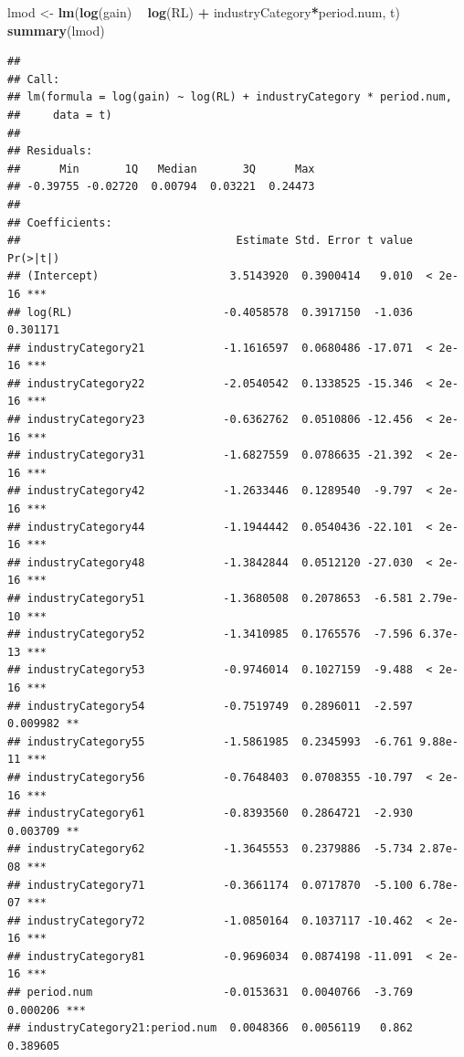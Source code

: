 \documentclass[
]{article}
\newenvironment{Shaded}{\begin{snugshade}}{\end{snugshade}}
\newcommand{\KeywordTok}[1]{\textcolor[rgb]{0.13,0.29,0.53}{\textbf{#1}}}
\newcommand{\NormalTok}[1]{#1}
\newcommand{\OperatorTok}[1]{\textcolor[rgb]{0.81,0.36,0.00}{\textbf{#1}}}
\newcommand{\StringTok}[1]{\textcolor[rgb]{0.31,0.60,0.02}{#1}}
\begin{document}
\begin{Shaded}
\begin{Highlighting}[]
\NormalTok{lmod <-}\StringTok{ }\KeywordTok{lm}\NormalTok{(}\KeywordTok{log}\NormalTok{(gain) }\OperatorTok{~}\StringTok{ }\KeywordTok{log}\NormalTok{(RL) }\OperatorTok{+}\StringTok{ }\NormalTok{industryCategory}\OperatorTok{*}\NormalTok{period.num, t)}
\KeywordTok{summary}\NormalTok{(lmod)}
\end{Highlighting}
\end{Shaded}

\begin{verbatim}
## 
## Call:
## lm(formula = log(gain) ~ log(RL) + industryCategory * period.num, 
##     data = t)
## 
## Residuals:
##      Min       1Q   Median       3Q      Max 
## -0.39755 -0.02720  0.00794  0.03221  0.24473 
## 
## Coefficients:
##                                 Estimate Std. Error t value Pr(>|t|)    
## (Intercept)                    3.5143920  0.3900414   9.010  < 2e-16 ***
## log(RL)                       -0.4058578  0.3917150  -1.036 0.301171    
## industryCategory21            -1.1616597  0.0680486 -17.071  < 2e-16 ***
## industryCategory22            -2.0540542  0.1338525 -15.346  < 2e-16 ***
## industryCategory23            -0.6362762  0.0510806 -12.456  < 2e-16 ***
## industryCategory31            -1.6827559  0.0786635 -21.392  < 2e-16 ***
## industryCategory42            -1.2633446  0.1289540  -9.797  < 2e-16 ***
## industryCategory44            -1.1944442  0.0540436 -22.101  < 2e-16 ***
## industryCategory48            -1.3842844  0.0512120 -27.030  < 2e-16 ***
## industryCategory51            -1.3680508  0.2078653  -6.581 2.79e-10 ***
## industryCategory52            -1.3410985  0.1765576  -7.596 6.37e-13 ***
## industryCategory53            -0.9746014  0.1027159  -9.488  < 2e-16 ***
## industryCategory54            -0.7519749  0.2896011  -2.597 0.009982 ** 
## industryCategory55            -1.5861985  0.2345993  -6.761 9.88e-11 ***
## industryCategory56            -0.7648403  0.0708355 -10.797  < 2e-16 ***
## industryCategory61            -0.8393560  0.2864721  -2.930 0.003709 ** 
## industryCategory62            -1.3645553  0.2379886  -5.734 2.87e-08 ***
## industryCategory71            -0.3661174  0.0717870  -5.100 6.78e-07 ***
## industryCategory72            -1.0850164  0.1037117 -10.462  < 2e-16 ***
## industryCategory81            -0.9696034  0.0874198 -11.091  < 2e-16 ***
## period.num                    -0.0153631  0.0040766  -3.769 0.000206 ***
## industryCategory21:period.num  0.0048366  0.0056119   0.862 0.389605    

\end{verbatim}
\end{document}
